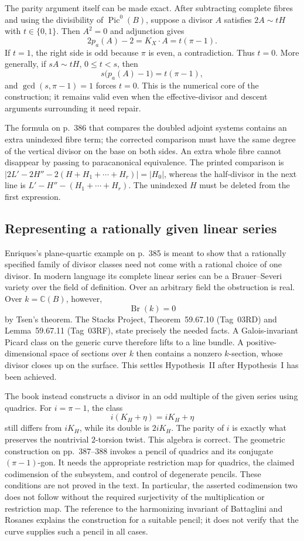The parity argument itself can be made exact. After subtracting complete fibres and using the divisibility of $\operatorname{Pic}^0(B)$, suppose a divisor $A$ satisfies $2A\sim tH$ with $t\in\{0,1\}$. Then $A^2=0$ and adjunction gives
\[
 2p_a(A)-2=K_X\cdot A=t(\pi-1).
\]
If $t=1$, the right side is odd because $\pi$ is even, a contradiction. Thus $t=0$. More generally, if $sA\sim tH$, $0\leq t<s$, then
\[
 s\bigl(p_a(A)-1\bigr)=t(\pi-1),
\]
and $\gcd(s,\pi-1)=1$ forces $t=0$. This is the numerical core of the construction; it remains valid even when the effective-divisor and descent arguments surrounding it need repair.

The formula on p.~386 that compares the doubled adjoint systems contains an extra unindexed fibre term; the corrected comparison must have the same degree of the vertical divisor on the base on both sides. An extra whole fibre cannot disappear by passing to paracanonical equivalence. The printed comparison is $|2L'-2H''-2(H+H_1+\cdots+H_r)|=|H_0|$, whereas the half-divisor in the next line is $L'-H''-(H_1+\cdots+H_r)$. The unindexed $H$ must be deleted from the first expression.

\subsection{Representing a rationally given linear series}

Enriques's plane-quartic example on p.~385 is meant to show that a rationally specified family of divisor classes need not come with a rational choice of one divisor. In modern language its complete linear series can be a Brauer--Severi variety over the field of definition. Over an arbitrary field the obstruction is real. Over $k=\mathbb C(B)$, however,
\[
 \operatorname{Br}(k)=0
\]
by Tsen's theorem. The Stacks Project, Theorem~59.67.10 (Tag~03RD) and Lemma~59.67.11 (Tag~03RF), state precisely the needed facts. A Galois-invariant Picard class on the generic curve therefore lifts to a line bundle. A positive-dimensional space of sections over $k$ then contains a nonzero $k$-section, whose divisor closes up on the surface. This settles Hypothesis~II after Hypothesis~I has been achieved.

The book instead constructs a divisor in an odd multiple of the given series using quadrics. For $i=\pi-1$, the class
\[
 i(K_H+\eta)=iK_H+\eta
\]
still differs from $iK_H$, while its double is $2iK_H$. The parity of $i$ is exactly what preserves the nontrivial $2$-torsion twist. This algebra is correct. The geometric construction on pp.~387--388 invokes a pencil of quadrics and its conjugate $(\pi-1)$-gon. It needs the appropriate restriction map for quadrics, the claimed codimension of the subsystem, and control of degenerate pencils. These conditions are not proved in the text. In particular, the asserted codimension two does not follow without the required surjectivity of the multiplication or restriction map. The reference to the harmonizing invariant of Battaglini and Rosanes explains the construction for a suitable pencil; it does not verify that the curve supplies such a pencil in all cases.

